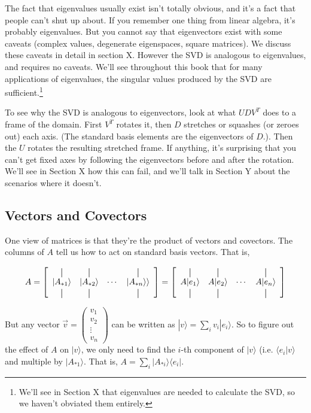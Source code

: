 \documentclass{amsbook}
\newcommand*{\vertbar}{\rule[-1ex]{0.5pt}{2.5ex}}
\begin{document}
The fact that eigenvalues usually exist isn't totally obvious, and it's a fact that people can't shut up about.  If you remember one thing from linear algebra, it's probably eigenvalues.  But you cannot say that eigenvectors exist with some caveats (complex values, degenerate eigenspaces, square matrices).  We discuss these caveats in detail in section X.  However the SVD is analogous to eigenvalues, and requires no caveats.  We'll see throughout this book that for many applications of eigenvalues, the singular values produced by the SVD are sufficient.\footnote{We'll see in Section X that eigenvalues are needed to calculate the SVD, so we haven't obviated them entirely.}

To see why the SVD is analogous to eigenvectors, look at what $UDV^T$ does to a frame of the domain.  First $V^T$ rotates it, then $D$ stretches or squashes (or zeroes out) each axis.  (The standard basis elements are the eigenvectors of $D$.). Then the $U$ rotates the resulting stretched frame.  If anything, it's surprising that you can't get fixed axes by following the eigenvectors before and after the rotation.  We'll see in Section X how this can fail, and we'll talk in Section Y about the scenarios where it doesn't.

\subsection{Vectors and Covectors}

One view of matrices is that they're the product of vectors and covectors.  The columns of $A$ tell us how to act on standard basis vectors.  That is,

$$
A = 
\left[
  \begin{array}{cccc}
    \vertbar & \vertbar & & \vertbar \\
    |A_{*1}\rangle  & |A_{*2}\rangle & \cdots & |A_{*n}\rangle\rangle    \\
    \vertbar & \vertbar & & \vertbar 
  \end{array}
\right] =
\left[
  \begin{array}{cccc}
    \vertbar & \vertbar & & \vertbar \\
    A|e_1\rangle    & A|e_2\rangle   & \cdots & A|e_n\rangle    \\
    \vertbar & \vertbar & & \vertbar 
  \end{array}
\right]
$$

But any vector $\vec v=\begin{pmatrix} v_1  \\  v_2 \\ \vdots \\ v_n  \end{pmatrix}$ can be written as $|v\rangle = \sum_i v_i|e_i\rangle$.  So to figure out the effect of $A$ on $|v\rangle$, we only need to find the $i$-th component of $|v\rangle$ (i.e. $\langle e_i|v\rangle$ and multiple by $|A_{*1}\rangle$.  That is, $A=\sum_i|A_{*i}\rangle\langle e_i|$.
\end{document}
